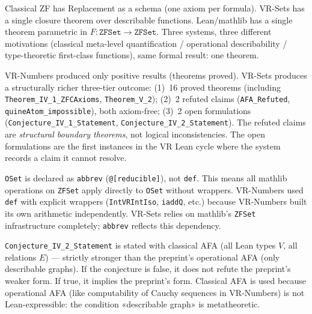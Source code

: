 \begin{remark}
\label{rem:D1_schema}
\leanok
{}
Classical ZF has Replacement as a schema (one axiom per formula).
VR-Sets has a single closure theorem over describable functions.
Lean/mathlib has a single theorem parametric in $F : \texttt{ZFSet}
\to \texttt{ZFSet}$.  Three systems, three different motivations
(classical meta-level quantification / operational describability /
type-theoretic first-class functions), same formal result: one theorem.
\end{remark}

\begin{remark}
\label{rem:D2_three_tier}
\leanok
VR-Numbers produced only positive results (theorems proved).  VR-Sets
produces a structurally richer three-tier outcome: (1)~16 proved
theorems (including \texttt{Theorem\_IV\_1\_ZFCAxioms},
\texttt{Theorem\_V\_2}); (2)~2 refuted claims
(\texttt{AFA\_Refuted}, \texttt{quineAtom\_impossible}), both axiom-free;
(3)~2 open formulations
(\texttt{Conjecture\_IV\_1\_Statement},
\texttt{Conjecture\_IV\_2\_Statement}).  The refuted claims are
\emph{structural boundary theorems}, not logical inconsistencies.
The open formulations are the first instances in the VR Lean cycle
where the system records a claim it cannot resolve.
\end{remark}

\begin{remark}
\label{rem:D3_abbrev}
\leanok
{}
\texttt{OSet} is declared as \texttt{abbrev} (\texttt{@[reducible]}),
not \texttt{def}.  This means all mathlib operations on \texttt{ZFSet}
apply directly to \texttt{OSet} without wrappers.  VR-Numbers used
\texttt{def} with explicit wrappers (\texttt{IntVRIntIso},
\texttt{iaddQ}, etc.) because VR-Numbers built its own arithmetic
independently.  VR-Sets relies on mathlib's \texttt{ZFSet}
infrastructure completely; \texttt{abbrev} reflects this dependency.
\end{remark}

\begin{remark}
\label{rem:D4_classical_afa}
\leanok
{}
\texttt{Conjecture\_IV\_2\_Statement} is stated with classical AFA
(all Lean types $V$, all relations $E$) --- strictly stronger than the
preprint's operational AFA (only describable graphs).  If the conjecture
is false, it does not refute the preprint's weaker form.  If true, it
implies the preprint's form.  Classical AFA is used because operational
AFA (like computability of Cauchy sequences in VR-Numbers) is not
Lean-expressible: the condition «describable graph» is metatheoretic.
\end{remark}

